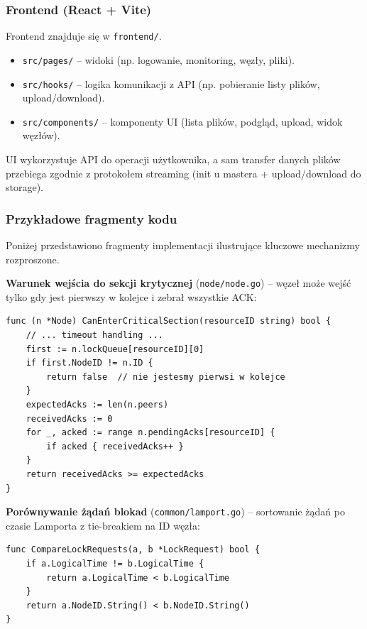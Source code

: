 \documentclass[12pt,a4paper]{article}
\begin{document}
	\subsubsection{Frontend (React + Vite)}
	Frontend znajduje się w \texttt{frontend/}.
	\begin{itemize}
		\item \texttt{src/pages/} -- widoki (np. logowanie, monitoring, węzły, pliki).
		\item \texttt{src/hooks/} -- logika komunikacji z API (np. pobieranie listy plików, upload/download).
		\item \texttt{src/components/} -- komponenty UI (lista plików, podgląd, upload, widok węzłów).
	\end{itemize}
	UI wykorzystuje API do operacji użytkownika, a sam transfer danych plików przebiega zgodnie z protokołem streaming (init u mastera + upload/download do storage).

	\subsubsection{Przykładowe fragmenty kodu}
	Poniżej przedstawiono fragmenty implementacji ilustrujące kluczowe mechanizmy rozproszone.

	\textbf{Warunek wejścia do sekcji krytycznej} (\texttt{node/node.go}) -- węzeł może wejść tylko gdy jest pierwszy w kolejce i zebrał wszystkie ACK:
	\begin{lstlisting}
func (n *Node) CanEnterCriticalSection(resourceID string) bool {
    // ... timeout handling ...
    first := n.lockQueue[resourceID][0]
    if first.NodeID != n.ID {
        return false  // nie jestesmy pierwsi w kolejce
    }
    expectedAcks := len(n.peers)
    receivedAcks := 0
    for _, acked := range n.pendingAcks[resourceID] {
        if acked { receivedAcks++ }
    }
    return receivedAcks >= expectedAcks
}
	\end{lstlisting}

	\textbf{Porównywanie żądań blokad} (\texttt{common/lamport.go}) -- sortowanie żądań po czasie Lamporta z tie-breakiem na ID węzła:
	\begin{lstlisting}
func CompareLockRequests(a, b *LockRequest) bool {
    if a.LogicalTime != b.LogicalTime {
        return a.LogicalTime < b.LogicalTime
    }
    return a.NodeID.String() < b.NodeID.String()
}
	\end{lstlisting}
\end{document}
